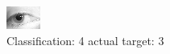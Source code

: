 \begin{figure}[h!]
\begin{center}
\includegraphics[width=0.60\columnwidth]{figures/ID1397_class_4_target_3.png}
\end{center}
\caption{ Classification: 4 actual target: 3}
\label{fig:ID1397_class_4_target_3}
\end{figure}
